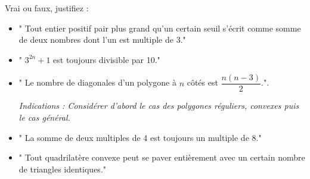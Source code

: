 Vrai ou faux, justifiez :
\begin{itemize}
  \item " Tout entier positif pair plus grand qu'un certain seuil s'écrit
  comme somme de deux nombres dont l'un est multiple de 3."
  \item " $3^{2n} + 1$ est toujours divisible par 10."
  \item " Le nombre de diagonales d'un polygone à $n$ côtés est
  $\dfrac{n(n-3)}{2}$.".

  \emph{Indications : Considérer d'abord le cas des polygones réguliers,
  convexes puis le cas général.}
  \item " La somme de deux multiples de 4 est toujours un multiple de 8."
  \item " Tout quadrilatère convexe peut se paver entièrement avec un certain
  nombre de triangles identiques."
\end{itemize}
